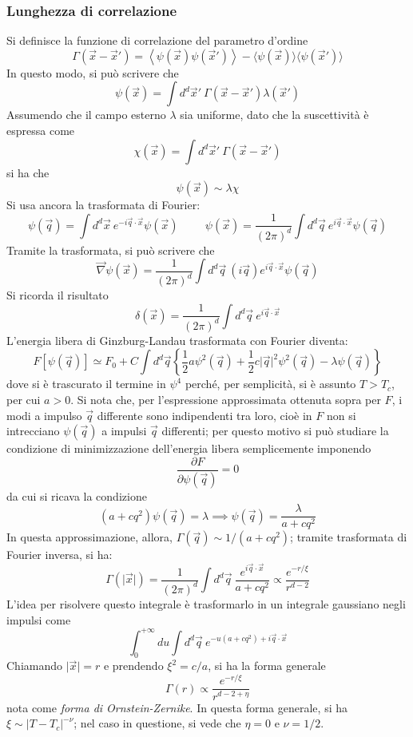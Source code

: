 \documentclass[11pt, a4paper]{scrartcl}
\theoremstyle{style}
\theoremstyle{style1}
\numberwithin{equation}{subsection}
\begin{document}
\subsubsection{Lunghezza di correlazione}
Si definisce la funzione di correlazione del parametro d'ordine
\[
\Gamma(\vec{x}- \vec{x}') = \left\langle \psi (\vec{x}) \psi (\vec{x}')  \right\rangle - \langle \psi (\vec{x}) \rangle \langle \psi (\vec{x}') \rangle
\] 
In questo modo, si pu\`o scrivere che
\[
\psi (\vec{x}) = \int d^d \vec{x}' \ \Gamma(\vec{x}-\vec{x}') \lambda (\vec{x}')
\] 
Assumendo che il campo esterno $\lambda $ sia uniforme, dato che la suscettivit\`a \`e espressa come
\[
\chi (\vec{x}) = \int d^d \vec{x}' \ \Gamma(\vec{x}- \vec{x}') 
\] 
si ha che
\[
\psi (\vec{x}) \sim \lambda\chi  
\] 
Si usa ancora la trasformata di Fourier:
\[
\psi (\vec{q}) = \int d^d \vec{x} \ e^{-i \vec{q}\cdot \vec{x}}\psi (\vec{x}) \hspace{1cm} \psi (\vec{x}) = \frac{1}{(2\pi)^d} \int d^d \vec{q} \ e^{i \vec{q}\cdot \vec{x}} \psi (\vec{q})
\] 
Tramite la trasformata, si pu\`o scrivere che
\[
\vec{\nabla }\psi (\vec{x}) = \frac{1}{(2\pi)^d} \int d^d \vec{q }\ (i\vec{q}) e^{i \vec{q}\cdot \vec{x}}\psi (\vec{q})
\] 
Si ricorda il risultato 
\[
\delta (\vec{x}) = \frac{1}{(2\pi)^d} \int d^d \vec{q} \ e^{i \vec{q}\cdot \vec{x}}
\] 
L'energia libera di Ginzburg-Landau trasformata con Fourier diventa:
\[
	F [ \psi (\vec{q}) ] \simeq F_0 + C \int d^d \vec{q} \left\{ \frac{1}{2}a \psi ^2 (\vec{q}) + \frac{1}{2} c \lvert \vec{q} \rvert ^2 \psi ^2 (\vec{q}) - \lambda \psi (\vec{q}) \right\} 
\] 
dove si \`e trascurato il termine in $\psi ^4$ perch\'e, per semplicit\`a, si \`e assunto $T>T_c$, per cui $a>0$.
Si nota che, per l'espressione approssimata ottenuta sopra per $F$, i modi a impulso $\vec{q}$ differente sono indipendenti tra loro, cio\`e in $F$ non si intrecciano $\psi (\vec{q})$ a impulsi $\vec{q}$ differenti; per questo motivo si pu\`o studiare la condizione di minimizzazione dell'energia libera semplicemente imponendo 
\[
\frac{\partial F}{\partial \psi (\vec{q})} = 0 
\] 
da cui si ricava la condizione 
\[
	(a + cq^2) \psi (\vec{q}) = \lambda \implies \psi (\vec{q}) = \frac{\lambda}{a + cq^2}
\] 
In questa approssimazione, allora, $\Gamma (\vec{q}) \sim 1 / (a+cq^2)$; tramite trasformata di Fourier inversa, si ha:
\[
\Gamma\left(\lvert \vec{x} \rvert \right)  = \frac{1}{(2\pi)^d} \int d^d \vec{q}\ \frac{e ^{i \vec{q}\cdot \vec{x}}}{a + cq^2}\propto \frac{e^{-r / \xi }}{r^{d-2}}
\] 
L'idea per risolvere questo integrale \`e trasformarlo in un integrale gaussiano negli impulsi come
\[
\int_{0} ^{+\infty} du \int d^d \vec{q} \ e^{-u (a+cq^2) + i \vec{q }\cdot \vec{x}}
\] 
Chiamando $\lvert \vec{x} \rvert = r$ e prendendo $\xi ^2 = c / a$, si ha la forma generale 
\[
\Gamma(r) \propto \frac{e^{-r / \xi }}{r ^{d-2+\eta}}
\] 
nota come \textit{forma di Ornstein-Zernike}.
In questa forma generale, si ha $\xi \sim \lvert T -T_c \rvert ^{-\nu }$; nel caso in questione, si vede che $\eta =0 $ e $\nu  = 1 / 2$.
\end{document}
